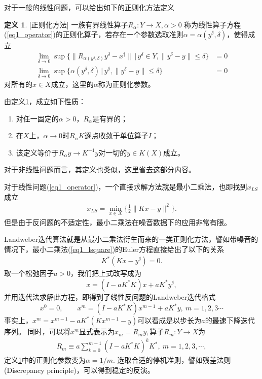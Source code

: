 \documentclass[a4paper,12pt,oneside,CJK]{cctbook}
\theoremstyle{definition}
\newtheorem{defn} {\indent 定义}[section]
\numberwithin{equation}{section}
\begin{document}
对于一般的线性问题，可以给出如下的正则化方法定义
\begin{defn}\label{def1_regularization}[正则化方法]
一族有界线性算子$R_{\alpha}:Y\rightarrow X, \alpha>0$
称为线性算子方程(\ref{eq1_operator})的正则化算子，若存在一个参数选取准则$\alpha=\alpha(y^{\delta},\delta)$，使得成立
\begin{align*}
\lim_{\delta\rightarrow 0}\sup\{\|R_{\alpha(y^{\delta},\delta)} y^{\delta} - x^{\dag}\| \, |\, y^{\delta}\in Y, \|y^{\delta}-y\|\leq \delta \} & = 0 \\
\lim_{\delta\rightarrow 0}\sup\{\alpha(y^{\delta},\delta) \, | \, y^{\delta}, \|y^{\delta}-y\|\leq \delta \} & = 0
\end{align*}
对所有的$x\in X$成立，这里的$\alpha$称为正则化参数。
\end{defn}

由定义\ref{def1_regularization}，成立如下性质：
\begin{enumerate}
   \item 对任一固定的$\alpha>0$，$R_{\alpha}$是有界的；
  \item 在$X$上，$\alpha\rightarrow 0$时$R_{\alpha}K$逐点收敛于单位算子$I$；
  \item 该定义等价于$R_{\alpha}y\rightarrow K^{-1}y$对一切的$y\in K(X)$成立。
\end{enumerate}
对于非线性问题而言，其定义也类似，这里省去这部分内容。

对于线性问题(\ref{eq1_operator})，一个直接求解方法就是最小二乘法，也即找到$x_{LS}$成立
\begin{align}\label{eq1_lsquare}
x_{LS} = \min_{x\in X}\{\frac{1}{2}\|Kx - y\|^2\}.
\end{align}
但是由于反问题的不适定性，最小二乘法在噪音数据下的应用非常有限。

Landweber迭代算法就是从最小二乘法衍生而来的一类正则化方法，譬如带噪音的情况下，最小二乘法(\ref{eq1_lsquare})的Euler方程直接给出了以下的关系
\begin{align*}
K^*(Kx-y^{\delta}) = 0.
\end{align*}
取一个松弛因子$a>0$，我们把上式改写成为
$$
    x=(I-a K^*K)x+a K^*y^{\delta},
$$
并用迭代法求解此方程，即得到了线性反问题的Landweber迭代格式
$$
    x^0=0,\qquad x^m=(I-a K^* K)x^{m-1}+a K^*y,~m=1,2,3\cdots
$$
事实上，$x^m=x^{m-1}-a K^*(K x^{m-1}-y)$可以看成是以步长为$a$的最速下降迭代序列。
同时，可以将$x^m$显式表示为$x_m=R_m y,$算子$R_m:Y\rightarrow X$为
\begin{eqnarray*}
   R_m\equiv a\sum_{k=0}^{m-1}(I-a K^* K)^k K^*,~m=1,2,3,\cdots,
\end{eqnarray*}
定义\ref{def1_regularization}中的正则化参数变为$\alpha=1/m$. 选取合适的停机准则，譬如残差法则(Discrepancy principle)，可以得到稳定的反演。
\end{document}
